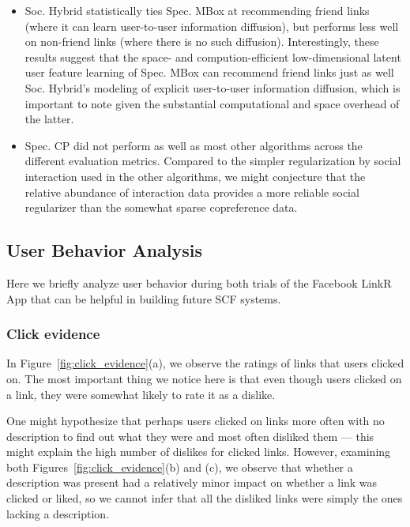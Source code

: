 \begin{itemize}
\item Soc. Hybrid statistically ties Spec. MBox at 
recommending friend links (where it can learn user-to-user information
diffusion), but performs less well on non-friend links (where there is
no such diffusion).
Interestingly, these results suggest that the space- and
compution-efficient low-dimensional latent user feature learning of
Spec. MBox can recommend friend links just as well Soc. Hybrid's 
modeling of explicit user-to-user information diffusion, which is
important to note given the substantial computational and space
overhead of the latter.

\item Spec. CP did not perform as well as most other algorithms
across the different evaluation metrics.  Compared to the simpler
regularization by social interaction used in the other algorithms,
we might conjecture that the relative abundance of interaction data
provides a more reliable social regularizer than the somewhat sparse
copreference data.
\end{itemize}


\subsection{User Behavior Analysis}

\label{sec:behavior}

Here we briefly analyze user behavior during both trials of the Facebook
LinkR App that can be helpful in building future SCF systems.

\subsubsection{Click evidence}

In Figure~\ref{fig:click_evidence}(a), we observe the ratings of links
that users clicked on.  The most important thing we notice 
here is that even though users
clicked on a link, they were somewhat likely to rate it as a dislike.

One might hypothesize that perhaps users clicked on links more often
with no description to find out what they were and most often disliked
them --- this might explain the high number of dislikes for clicked
links.  However, examining both Figures~\ref{fig:click_evidence}(b)
and (c), we observe that whether a description was present had a
relatively minor impact on whether a link was clicked or liked, so we
cannot infer that all the disliked links were simply the ones lacking
a description.


